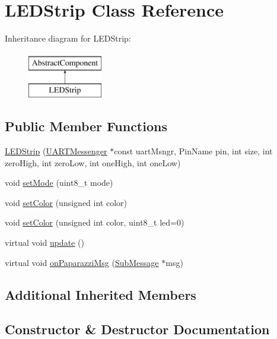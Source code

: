 \hypertarget{class_l_e_d_strip}{}\section{L\+E\+D\+Strip Class Reference}
\label{class_l_e_d_strip}
Inheritance diagram for L\+E\+D\+Strip\+:\begin{figure}[H]
\begin{center}
\leavevmode
\includegraphics[height=2.000000cm]{class_l_e_d_strip}
\end{center}
\end{figure}
\subsection*{Public Member Functions}
\begin{DoxyCompactItemize}
\item 
\hyperlink{class_l_e_d_strip_a746e420e05c5d6c45eb2f74eaf5928fc}{L\+E\+D\+Strip} (\hyperlink{class_u_a_r_t_messenger}{U\+A\+R\+T\+Messenger} $\ast$const uart\+Msngr, Pin\+Name pin, int size, int zero\+High, int zero\+Low, int one\+High, int one\+Low)
\item 
void \hyperlink{class_l_e_d_strip_abf199367f3caaf9730262c4e7bef6bc1}{set\+Mode} (uint8\+\_\+t mode)
\item 
void \hyperlink{class_l_e_d_strip_a310b381acdd83a01ddb6e2debebbbc7c}{set\+Color} (unsigned int color)
\item 
void \hyperlink{class_l_e_d_strip_a1f9d9c2784c9ad893163f7f17e603ce7}{set\+Color} (unsigned int color, uint8\+\_\+t led=0)
\item 
virtual void \hyperlink{class_l_e_d_strip_abc57d90870bb0e9c0d05e7ba6ca76c95}{update} ()
\item 
virtual void \hyperlink{class_l_e_d_strip_af9708cc14c0e3f75e5b3c268b398f436}{on\+Paparazzi\+Msg} (\hyperlink{struct_sub_message}{Sub\+Message} $\ast$msg)
\end{DoxyCompactItemize}
\subsection*{Additional Inherited Members}


\subsection{Constructor \& Destructor Documentation}
\mbox{\label{class_l_e_d_strip_a746e420e05c5d6c45eb2f74eaf5928fc}} 
